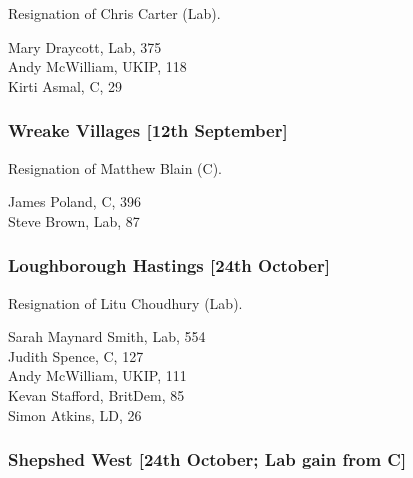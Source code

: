 \documentclass[a4paper,openany,10pt]{book}
\begin{document}

Resignation of Chris Carter (Lab).



Mary Draycott, Lab, 375\\
Andy McWilliam, UKIP, 118\\
Kirti Asmal, C, 29\\


\subsubsection*{Wreake Villages \hspace*{\fill}\nolinebreak[1]%
\enspace\hspace*{\fill}
[12th September]}


Resignation of Matthew Blain (C).



James Poland, C, 396\\
Steve Brown, Lab, 87\\


\subsubsection*{Loughborough Hastings \hspace*{\fill}\nolinebreak[1]%
\enspace\hspace*{\fill}
[24th October]}


Resignation of Litu Choudhury (Lab).



{Sarah Maynard Smith}, Lab, 554\\
Judith Spence, C, 127\\
Andy McWilliam, UKIP, 111\\
Kevan Stafford, BritDem, 85\\
Simon Atkins, LD, 26\\


\subsubsection*{Shepshed West \hspace*{\fill}\nolinebreak[1]%
\enspace\hspace*{\fill}
[24th October; Lab gain from C]}
\end{document}
